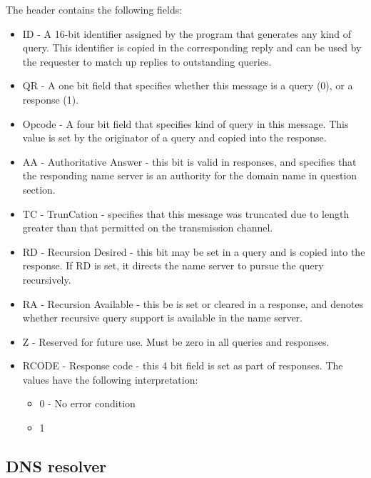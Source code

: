 \documentclass[a4paper, 11pt]{article}
\begin{document}
        The header contains the following fields:
        \begin{itemize}
            \item ID - A 16-bit identifier assigned by the program that generates any kind of query. 
                This identifier is copied in the corresponding reply and can be used by the requester to match up replies to outstanding queries.
            \item QR - A one bit field that specifies whether this message is a query (0), or a response (1).
            \item Opcode - A four bit field that specifies kind of query in this message. 
                This value is set by the originator of a query and copied into the response.
            \item AA - Authoritative Answer - this bit is valid in responses, 
                and specifies that the responding name server is an authority for the domain name in question section.
            \item TC - TrunCation - specifies that this message was truncated due to length greater than that permitted on the transmission channel.
            \item RD - Recursion Desired - this bit may be set in a query and is copied into the response. 
                If RD is set, it directs the name server to pursue the query recursively.
            \item RA - Recursion Available - this be is set or cleared in a response, 
                and denotes whether recursive query support is available in the name server.
            \item Z - Reserved for future use. Must be zero in all queries and responses.
            \item RCODE - Response code - this 4 bit field is set as part of responses. 
                The values have the following interpretation:
                \begin{itemize}
                    \item 0 - No error condition
                    \item 1
                \end{itemize}
        \end{itemize}

    \subsection{DNS resolver}
\end{document}
